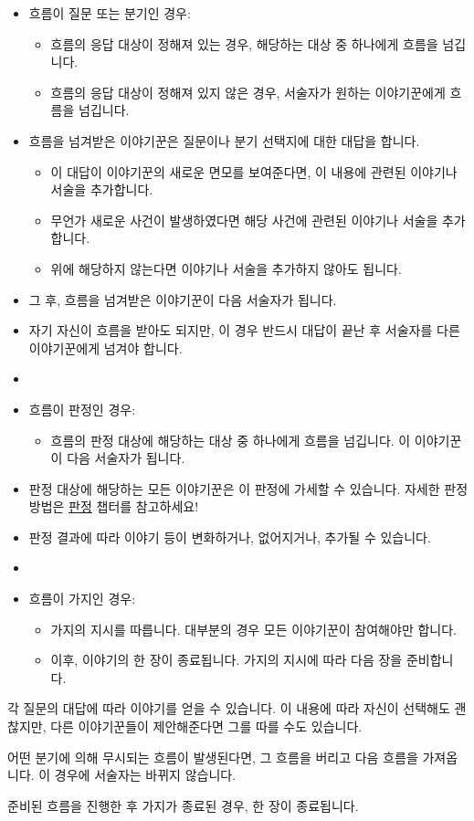 \documentclass{report}
\begin{document}
		\begin{itemize}
			\item 흐름이 질문 또는 분기인 경우:
			\begin{itemize}
				\item 흐름의 응답 대상이 정해져 있는 경우, 해당하는 대상 중 하나에게 흐름을 넘깁니다.
				\item 흐름의 응답 대상이 정해져 있지 않은 경우, 서술자가 원하는 이야기꾼에게 흐름을 넘깁니다.
			\end{itemize}
			\item[] 흐름을 넘겨받은 이야기꾼은 질문이나 분기 선택지에 대한 대답을 합니다.
			\begin{itemize}
				\item 이 대답이 이야기꾼의 새로운 면모를 보여준다면, 이 내용에 관련된 이야기나 서술을 추가합니다.
				\item 무언가 새로운 사건이 발생하였다면 해당 사건에 관련된 이야기나 서술을 추가합니다.
				\item 위에 해당하지 않는다면 이야기나 서술을 추가하지 않아도 됩니다.
			\end{itemize}
			\item[] 그 후, 흐름을 넘겨받은 이야기꾼이 다음 서술자가 됩니다.
			\item[] 자기 자신이 흐름을 받아도 되지만, 이 경우 반드시 대답이 끝난 후 서술자를 다른 이야기꾼에게 넘겨야 합니다.
			
			\item[]
			
			\item 흐름이 판정인 경우:
			\begin{itemize}
				\item 흐름의 판정 대상에 해당하는 대상 중 하나에게 흐름을 넘깁니다. 이 이야기꾼이 다음 서술자가 됩니다.
			\end{itemize}
			\item[] 판정 대상에 해당하는 모든 이야기꾼은 이 판정에 가세할 수 있습니다. 자세한 판정 방법은 \hyperlink{nogm-diceroll}{판정} 챕터를 참고하세요!
			\item[] 판정 결과에 따라 이야기 등이 변화하거나, 없어지거나, 추가될 수 있습니다.
			
			\item[] 
			
			\item 흐름이 가지인 경우:
			\begin{itemize}
				\item 가지의 지시를 따릅니다. 대부분의 경우 모든 이야기꾼이 참여해야만 합니다.
				\item 이후, 이야기의 한 장이 종료됩니다. 가지의 지시에 따라 다음 장을 준비합니다.
			\end{itemize}
		\end{itemize}
		
		각 질문의 대답에 따라 이야기를 얻을 수 있습니다. 이 내용에 따라 자신이 선택해도 괜찮지만, 다른 이야기꾼들이 제안해준다면 그를 따를 수도 있습니다.
		
		어떤 분기에 의해 무시되는 흐름이 발생된다면, 그 흐름을 버리고 다음 흐름을 가져옵니다. 이 경우에 서술자는 바뀌지 않습니다.
		
		준비된 흐름을 진행한 후 가지가 종료된 경우, 한 장이 종료됩니다.
		
\end{document}
